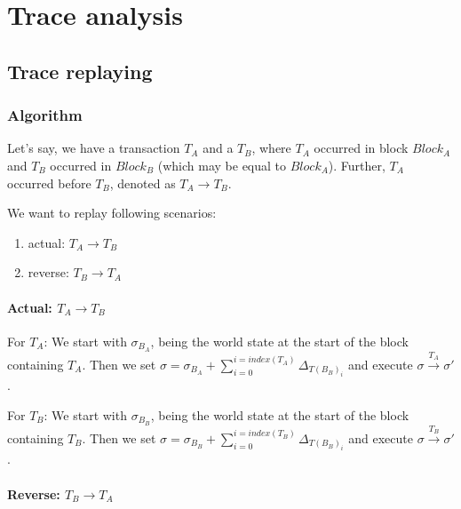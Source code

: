 \documentclass[draft,final]{vutinfth} %
\begin{document}
\chapter{Trace analysis}


\section{Trace replaying}

\subsection{Algorithm}

Let's say, we have a transaction $T_A$ and a $T_B$, where $T_A$ occurred in block $Block_A$ and $T_B$ occurred in $Block_B$ (which may be equal to $Block_A$). Further, $T_A$ occurred before $T_B$, denoted as $T_A \rightarrow T_B$.

We want to replay following scenarios:

\begin{enumerate}
    \item actual: $T_A \rightarrow T_B$
    \item reverse: $T_B \rightarrow T_A$
\end{enumerate}

\subsubsection{Actual: $T_A \rightarrow T_B$}

For $T_A$: We start with $\sigma_{B_A}$, being the world state at the start of the block containing $T_A$. Then we set $\sigma = \sigma_{B_A} + \sum_{i=0}^{i=index(T_A)}\Delta_{T(B_B)_i}$ and execute $\sigma \xrightarrow{T_A} \sigma\prime$.

For $T_B$: We start with $\sigma_{B_B}$, being the world state at the start of the block containing $T_B$. Then we set $\sigma = \sigma_{B_B} + \sum_{i=0}^{i=index(T_B)}\Delta_{T(B_B)_i}$ and execute $\sigma \xrightarrow{T_B} \sigma\prime$.

\subsubsection{Reverse: $T_B \rightarrow T_A$}
\end{document}
